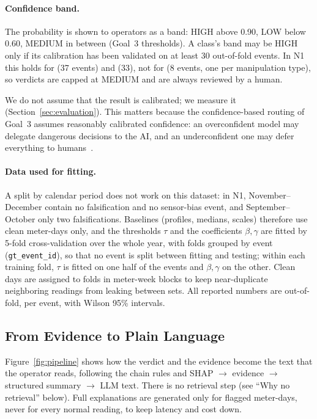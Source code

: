 \documentclass[11pt,a4paper]{article}
\begin{document}
\paragraph{Confidence band.} The probability is shown to operators as a band: HIGH above 0.90, LOW below
0.60, MEDIUM in between (Goal~3 thresholds). A class's band may be HIGH only if its calibration has been
validated on at least 30 out-of-fold events. In N1 this holds for \GE{} (37 events) and \MF{} (33), not for
\SD{} (8 events, one per manipulation type), so \SD{} verdicts are capped at MEDIUM and are always reviewed by
a human.

We do not assume that the result is calibrated; we measure it (Section~\ref{sec:evaluation}). This matters because the confidence-based routing of Goal~3 assumes reasonably calibrated confidence: an overconfident model may delegate dangerous decisions to the AI, and an underconfident one may defer everything to humans~\cite{trustcal}.

\paragraph{Data used for fitting.} A split by calendar period does not work on this dataset: in N1,
November--December contain no falsification and no sensor-bias event, and September--October only two
falsifications. Baselines (profiles, medians, scales) therefore use clean meter-days only, and the thresholds
$\tau$ and the coefficients $\beta,\gamma$ are fitted by 5-fold cross-validation over the whole year, with folds
grouped by event (\texttt{gt\_event\_id}), so that no event is split between fitting and testing; within each
training fold, $\tau$ is fitted on one half of the events and $\beta,\gamma$ on the other. Clean days are
assigned to folds in meter-week blocks to keep near-duplicate neighboring readings from leaking between sets.
All reported numbers are out-of-fold, per event, with Wilson 95\% intervals.

\subsection{From Evidence to Plain Language}
\label{sec:language}
Figure~\ref{fig:pipeline} shows how the verdict and the evidence become the text that the operator reads,
following the chain rules and SHAP $\rightarrow$ evidence $\rightarrow$ structured summary $\rightarrow$ LLM text.
There is no retrieval step (see ``Why no retrieval'' below). Full explanations are generated only for flagged
meter-days, never for every normal reading, to keep latency and cost down.
\end{document}
